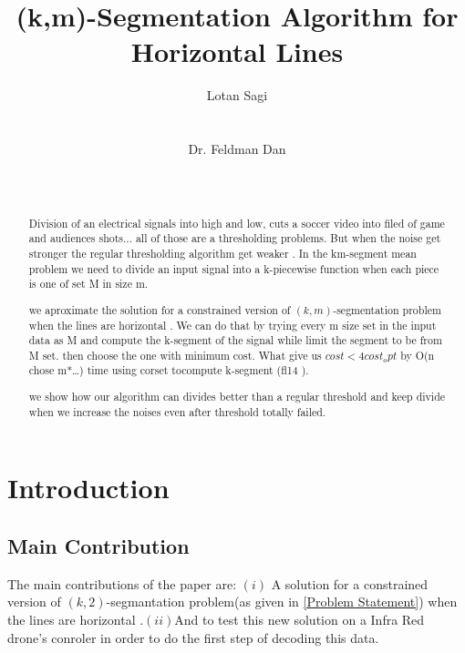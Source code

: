 \documentclass{vldb}
\begin{document}
\title{(k,m)-Segmentation Algorithm for \\Horizontal Lines}


\author{
\alignauthor Lotan Sagi\\
       \\
       \\
\alignauthor Dr. Feldman Dan\\
       \\
       \\
}
\maketitle
\begin{abstract}
   
 Division of an electrical signals into high and low, cuts a soccer video into filed of game and audiences shots... all of those are a thresholding problems. But when the noise get stronger the regular thresholding algorithm get weaker . In the km-segment mean problem we need to divide an input signal into a k-piecewise function when each piece is one of set M in size m.

we aproximate the solution for a constrained version of $(k,m)$-segmentation problem when the lines are horizontal . We can do that by trying every m size set in the input data as M and compute the k-segment of the signal while limit the segment to be from M set. then choose the one with minimum cost. What give us $cost<4cost_opt$ by O(n chose m*…) time using corset tocompute k-segment (fl14 ).

we show how our algorithm can divides better than a regular threshold and keep divide when we increase the noises even after threshold totally failed.
\end{abstract}

\section{Introduction}
\subsection{Main Contribution}
The main contributions of the paper are: $(i)$ A solution for a constrained version of $(k,2)$-segmantation problem(as given in \ref{Problem Statement}) 
when the lines are horizontal .$(ii)$And to test this new solution on a Infra Red drone's conroler in order to do the first step of decoding this data.
\end{document}
